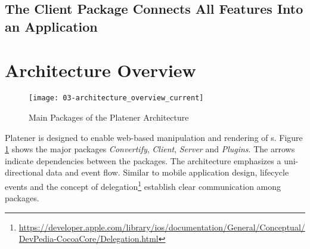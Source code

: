 \documentclass[../ClassicThesis.tex]{subfiles}
\begin{document}



\subsection{The Client Package Connects All Features Into an
  Application}
\label{sec:client-to-application}




\iffalse















\section{Architecture Overview}

\begin{figure}
  \texttt{[image: 03-architecture\_overview\_current]}
  \caption{Main Packages of the Platener Architecture}
  \label{fig:architectureOverviewCurrent}
\end{figure}

Platener is designed to enable web-based manipulation and rendering of
{\threedmodel}s. Figure \ref{fig:architectureOverviewCurrent} shows the major
packages \emph{Convertify}, \emph{Client}, \emph{Server} and \emph{Plugins}. The
arrows indicate dependencies between the packages. The architecture emphasizes a
uni-directional data and event flow. Similar to mobile application design,
lifecycle events and the concept of
delegation\footnote{\url{https://developer.apple.com/library/ios/documentation/General/Conceptual/DevPedia-CocoaCore/Delegation.html}}
establish clear communication among packages.

\end{document}
